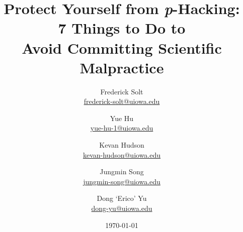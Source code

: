 \documentclass[12pt]{article}
\begin{document}
\title{Protect Yourself from \emph{p}-Hacking:\\ 7 Things to Do to\\ Avoid Committing Scientific Malpractice}		
\author{
    Frederick Solt\\
    \href{mailto:frederick-solt@uiowa.edu}{frederick-solt@uiowa.edu}
    \and
    Yue Hu\\
    \href{mailto:yue-hu-1@uiowa.edu}{yue-hu-1@uiowa.edu}
    \and
	Kevan Hudson\\
	\href{mailto:kevan-hudson@uiowa.edu}{kevan-hudson@uiowa.edu}
	\and
	Jungmin Song\\
    \href{mailto:jungmin-song@uiowa.edu}{jungmin-song@uiowa.edu}
	\and
	Dong `Erico' Yu\\
    \href{mailto:dong-yu@uiowa.edu}{dong-yu@uiowa.edu}
}
\date{\today}				
\maketitle

\begin{abstract}

\end{abstract}
\newpage


% 
% 
% 
% 
% 
% 
% 
% 

\newpage
\pagebreak



\end{document}
